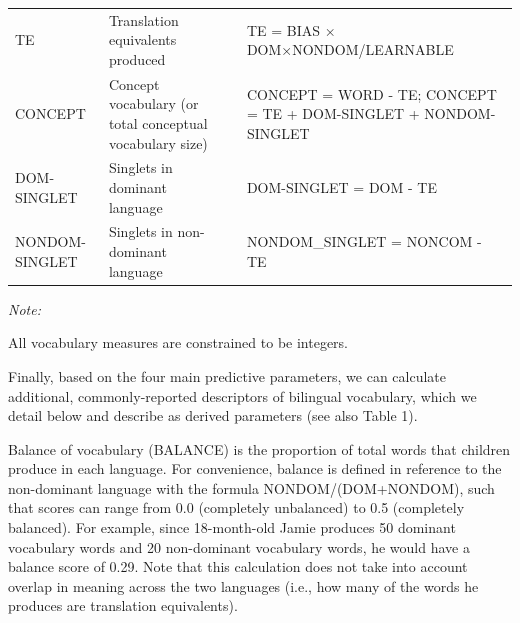 \documentclass[
  english,
  ,man,floatsintext]{apa6}
\begin{document}
\begin{landscape}
\begin{table}
\begin{threeparttable}
\begin{tabular}[t]{l>{\raggedright\arraybackslash}p{175px}>{\raggedright\arraybackslash}p{175px}>{\raggedright\arraybackslash}p{175px}}
\hspace{1em}TE & Translation equivalents produced &  & TE = BIAS × DOM×NONDOM/LEARNABLE\\
\hspace{1em}CONCEPT & Concept vocabulary (or total conceptual vocabulary size) &  & CONCEPT = WORD - TE; CONCEPT = TE + DOM-SINGLET + NONDOM-SINGLET\\
\hspace{1em}DOM-SINGLET & Singlets in dominant language &  & DOM-SINGLET = DOM - TE\\
\hspace{1em}NONDOM-SINGLET & Singlets in non-dominant language &  & NONDOM\_SINGLET = NONCOM - TE\\
\bottomrule
\end{tabular}
\begin{tablenotes}
\item \textit{Note: } 
\item All vocabulary measures are constrained to be integers.
\end{tablenotes}
\end{threeparttable}
\end{table}
\end{landscape}

Finally, based on the four main predictive parameters, we can calculate additional, commonly-reported descriptors of bilingual vocabulary, which we detail below and describe as derived parameters (see also Table 1).

Balance of vocabulary (BALANCE) is the proportion of total words that children produce in each language. For convenience, balance is defined in reference to the non-dominant language with the formula NONDOM/(DOM+NONDOM), such that scores can range from 0.0 (completely unbalanced) to 0.5 (completely balanced). For example, since 18-month-old Jamie produces 50 dominant vocabulary words and 20 non-dominant vocabulary words, he would have a balance score of 0.29. Note that this calculation does not take into account overlap in meaning across the two languages (i.e., how many of the words he produces are translation equivalents).
\end{document}
